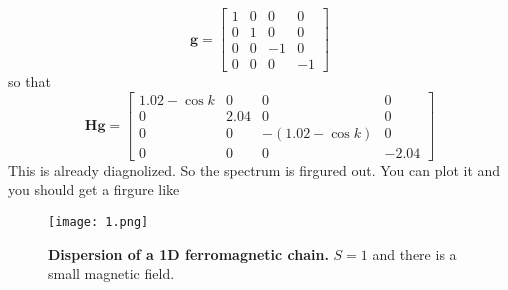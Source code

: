 \documentclass[letter]{article}
\begin{document}
$$
\mathbf{g}=\begin{bmatrix}
    1 & 0 & 0 & 0 \\
    0 &  1 & 0 &0 \\
    0 &  0 & -1 &0\\
    0 & 0 & 0& -1
\end{bmatrix}$$
so that $$
\mathbf{H}\mathbf{g}=\begin{bmatrix}
    1.02-\cos k & 0 & 0 & 0 \\
    0 &  2.04 & 0 &0 \\
    0 &  0 & -(1.02-\cos k) &0\\
    0 & 0 & 0& -2.04
\end{bmatrix}$$
This is already diagnolized. So the spectrum is firgured out. You can plot it and you should get a firgure like \cite{fig1}\\
\begin{figure*}
    \texttt{[image: 1.png]}
    \caption{\textbf{Dispersion of a 1D ferromagnetic chain.} $S=1$ and there is a small magnetic field.}
    \label{fig1}
\end{figure*}

\end{document}
